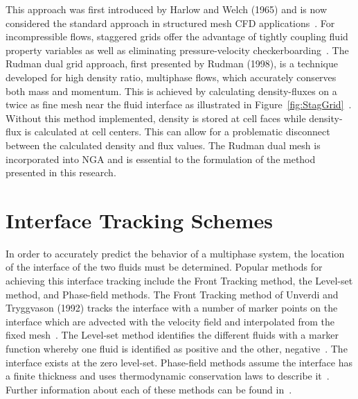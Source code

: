 This approach was first introduced by Harlow and Welch (1965) and is now considered the standard approach in structured mesh CFD applications~\cite{HARLOW1965}. For incompressible flows, staggered grids offer the advantage of tightly coupling fluid property variables as well as eliminating pressure-velocity checkerboarding~\cite{rudman}. The Rudman dual grid approach, first presented by Rudman (1998), is a technique developed for high density ratio, multiphase flows, which accurately conserves both mass and momentum. This is achieved by calculating density-fluxes on a twice as fine mesh near the fluid interface as illustrated in Figure~\ref{fig:StagGrid}~\cite{rudman}. Without  this method implemented, density is stored at cell faces while density-flux is calculated at cell centers. This can allow for a problematic disconnect between the calculated density and flux values. The Rudman dual mesh is incorporated into NGA and is essential to the formulation of the method presented in this research.


\section{Interface Tracking Schemes}%
In order to accurately predict the behavior of a multiphase system, the location of the interface of the two fluids must be determined. Popular methods for achieving this interface tracking include the Front Tracking method, the Level-set method, and Phase-field methods\cite{TRYG}. The Front Tracking method of Unverdi and Tryggvason (1992) tracks the interface with a number of marker points on the interface which are advected with the velocity field and interpolated from the fixed mesh~\cite{UNVERDI}. The Level-set method identifies the different fluids with a marker function whereby one fluid is identified as positive and the other, negative~\cite{OSHER}. The interface exists at the zero level-set. Phase-field methods assume the interface has a finite thickness and uses thermodynamic conservation laws to describe it~\cite{JACQMIN}. Further information about each of these methods can be found in~\cite{TRYG}.

